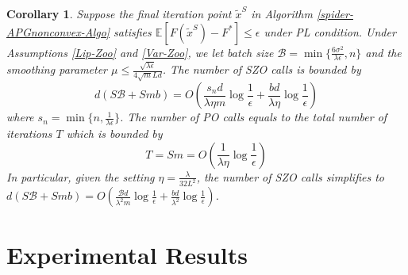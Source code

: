 \documentclass[iicol,sn-basic]{sn-jnl}
\theoremstyle{thmstyleone}%
\theoremstyle{thmstyletwo}%
\theoremstyle{thmstylethree}%
\newcommand*{\E}{\mathbb{E}}
\newtheorem{corollary}[theorem]{Corollary}
\begin{document}
\begin{corollary}\label{spider-PL-Zo-Cor}
Suppose the final iteration point $\tilde{x}^S$ in Algorithm \ref{spider-APGnonconvex-Algo} satisfies $\E[F(\tilde{x}^S) - F^*]\leq \epsilon$ under PL condition. Under Assumptions \ref{Lip-Zoo} and \ref{Var-Zoo}, we let batch size $\mathcal{B} = \min\{\frac{6\sigma^2}{\lambda\epsilon},n\}$ and the smoothing parameter $\mu \leq \frac{\sqrt{\lambda\epsilon}}{4 \sqrt{m} L d}$. The number of SZO calls is bounded by
\[
d(S\mathcal{B}+Smb) = O(\frac{s_n d}{\lambda\eta m}\log\frac{1}{\epsilon}+\frac{b d }{\lambda\eta}\log\frac{1}{\epsilon})
\]
where $s_n = \min \{n,\frac{1}{\lambda \epsilon}\}$.
The number of PO calls equals to the total number of iterations $T$ which is bounded by
\[
T = Sm = O(\frac{1}{\lambda\eta}\log\frac{1}{\epsilon})
\]
In particular, given the setting  $\eta = \frac{\lambda}{32 L^2}$, the number of SZO calls  simplifies to 
$d(S\mathcal{B}+Smb) = O(\frac{\mathcal{B}d}{\lambda^2 m}\log\frac{1}{\epsilon}+\frac{bd}{\lambda^2}\log\frac{1}{\epsilon})$.
\end{corollary}

\section{Experimental Results}
\end{document}
